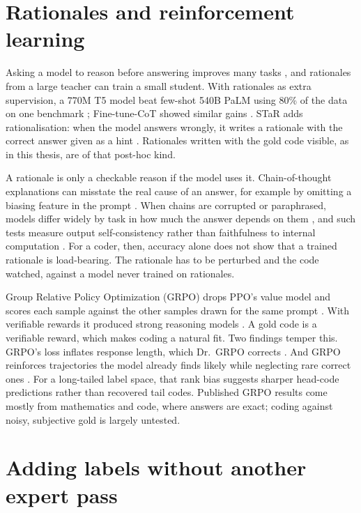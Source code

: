 \section{Rationales and reinforcement learning}
\label{sec:rw-reasoning}

Asking a model to reason before answering improves many tasks \citep{wei2022chain,kojima2022large}, and rationales from a large teacher can train a small student. With rationales as extra supervision, a 770M T5 model beat few-shot 540B PaLM using 80\% of the data on one benchmark \citep{hsieh2023distilling}; Fine-tune-CoT showed similar gains \citep{ho2023large}. STaR adds rationalisation: when the model answers wrongly, it writes a rationale with the correct answer given as a hint \citep{zelikman2022star}. Rationales written with the gold code visible, as in this thesis, are of that post-hoc kind.

A rationale is only a checkable reason if the model uses it. Chain-of-thought explanations can misstate the real cause of an answer, for example by omitting a biasing feature in the prompt \citep{turpin2023language}. When chains are corrupted or paraphrased, models differ widely by task in how much the answer depends on them \citep{lanham2023measuring}, and such tests measure output self-consistency rather than faithfulness to internal computation \citep{parcalabescu2024measuring}. For a coder, then, accuracy alone does not show that a trained rationale is load-bearing. The rationale has to be perturbed and the code watched, against a model never trained on rationales.

Group Relative Policy Optimization (GRPO) drops PPO's value model and scores each sample against the other samples drawn for the same prompt \citep{shao2024deepseekmath}. With verifiable rewards it produced strong reasoning models \citep{deepseek2025r1}. A gold code is a verifiable reward, which makes coding a natural fit. Two findings temper this. GRPO's loss inflates response length, which Dr.~GRPO corrects \citep{liu2025understanding}. And GRPO reinforces trajectories the model already finds likely while neglecting rare correct ones \citep{he2025rewarding}. For a long-tailed label space, that rank bias suggests sharper head-code predictions rather than recovered tail codes. Published GRPO results come mostly from mathematics and code, where answers are exact; coding against noisy, subjective gold is largely untested.

\section{Adding labels without another expert pass}
\label{sec:rw-labels}

